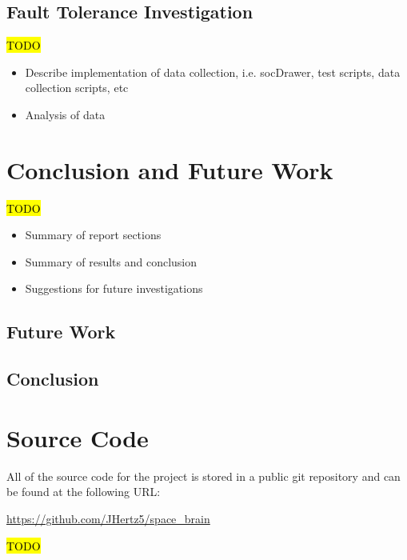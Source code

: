 \documentclass[12pt]{article}
\begin{document}
\subsection{Fault Tolerance Investigation}
\label{sec:Eval-FaultTolInv}

\hl{TODO}

\begin{itemize}
\item Describe implementation of data collection, i.e. socDrawer, test scripts, data collection scripts, etc
\item Analysis of data
\end{itemize}

\newpage

\section{Conclusion and Future Work}
\label{sec:Conclusion}

\hl{TODO}

\begin{itemize}
\item Summary of report sections
\item Summary of results and conclusion
\item Suggestions for future investigations
\end{itemize}

\subsection{Future Work}
\label{sec:Conclusion - FW}

\subsection{Conclusion}
\label{sec:Conclusion - C}

\newpage



\nocite{*}

\newpage

\appendix
\section{Source Code}
\label{Source}

All of the source code for the project is stored in a public git repository and can be found at the following URL:

\url{https://github.com/JHertz5/space_brain}


\hl{TODO}
\end{document}

